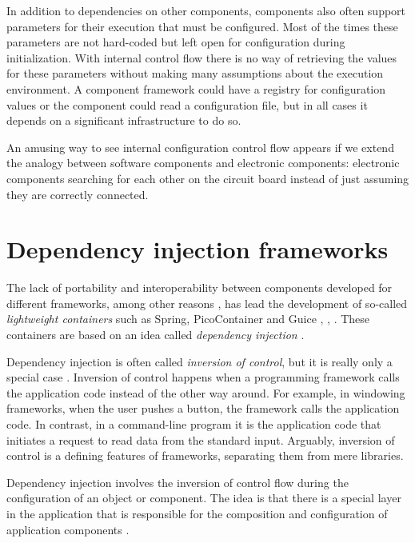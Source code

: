 In addition to dependencies on other components, components also often support parameters for their execution
that must be configured. Most of the times these parameters are not hard-coded but left open for configuration
during initialization. With internal control flow there is no way of retrieving the values for these parameters
without making many assumptions about the execution environment. A component framework could have a registry
for configuration values or the component could read a configuration file, but in all cases it depends on
a significant infrastructure to do so.

An amusing way to see internal configuration control flow appears if we extend the analogy between software components
and electronic components: electronic components searching for each other on the circuit board instead of just assuming
they are correctly connected.

\section{Dependency injection frameworks}

The lack of portability and interoperability between components developed for different frameworks, among other reasons \cite{Dearle},
has lead the development of so-called \emph{lightweight containers} such as Spring, PicoContainer and Guice \cite{Spring},
\cite{PicoContainer}, \cite{Guice}. These containers are based on an idea called \emph{dependency injection} \cite{Fowler2}.

Dependency injection is often called \emph{inversion of control}, but it is really only a special case \cite{Fowler1}.
Inversion of control happens when a programming framework calls the application code instead of the other way around.
For example, in windowing frameworks, when the user pushes a button, the framework calls the application code.
In contrast, in a command-line program it is the application code that initiates a request to read data from the standard input.
Arguably, inversion of control is a defining features of frameworks, separating them from mere libraries.

Dependency injection involves the inversion of control flow during the configuration of an object or component.
The idea is that there is a special layer in the application that is responsible for the composition and configuration
of application components \cite{Sobernig}.

